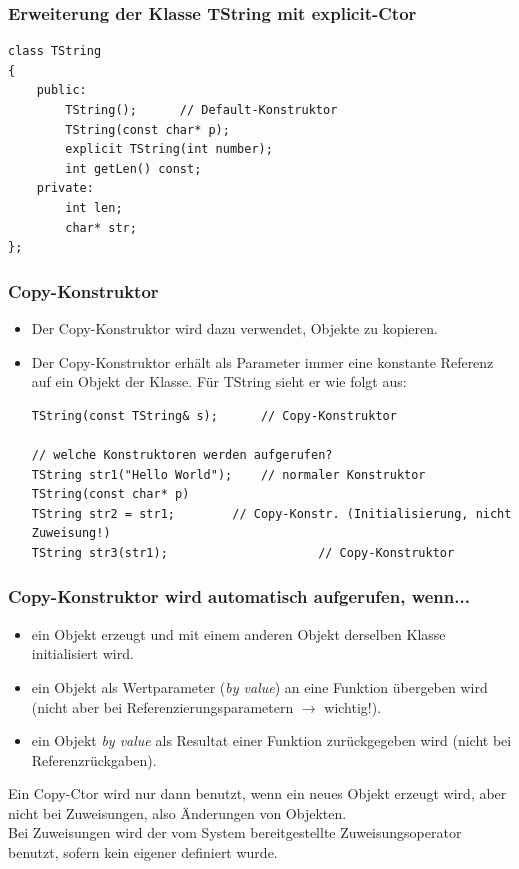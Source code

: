\subsubsection{Erweiterung der Klasse TString mit explicit-Ctor}
\vspace{-\baselineskip}
\begin{minipage}{0.5\linewidth}
\begin{lstlisting}
class TString
{
	public:
		TString();		// Default-Konstruktor
		TString(const char* p);
		explicit TString(int number);
		int getLen() const;
	private:
		int len;
		char* str;
};
\end{lstlisting}
\end{minipage}

\subsubsection{Copy-Konstruktor}
\begin{itemize}
	\item Der Copy-Konstruktor wird dazu verwendet, Objekte zu kopieren.
	\item Der Copy-Konstruktor erhält als Parameter immer eine konstante Referenz auf ein Objekt der Klasse. Für TString sieht er wie folgt aus:\\
	\vspace{-\baselineskip}
	\begin{minipage}{\linewidth}
\begin{lstlisting}
TString(const TString& s);		// Copy-Konstruktor

// welche Konstruktoren werden aufgerufen?
TString str1("Hello World");	// normaler Konstruktor TString(const char* p)
TString str2 = str1;		// Copy-Konstr. (Initialisierung, nicht Zuweisung!)
TString str3(str1);						// Copy-Konstruktor
\end{lstlisting}
	\end{minipage}
\end{itemize}

\subsubsection{Copy-Konstruktor wird automatisch aufgerufen, wenn...}
\begin{itemize}
	\item ein Objekt erzeugt und mit einem anderen Objekt derselben Klasse initialisiert wird.
	\item ein Objekt als Wertparameter (\emph{by value}) an eine Funktion übergeben wird (nicht aber bei Referenzierungsparametern $\rightarrow$ wichtig!).
	\item ein Objekt \emph{by value} als Resultat einer Funktion zurückgegeben wird (nicht bei Referenzrückgaben).
\end{itemize}
Ein Copy-Ctor wird nur dann benutzt, wenn ein neues Objekt erzeugt wird, aber nicht bei Zuweisungen, also Änderungen von Objekten.\\
Bei Zuweisungen wird der vom System bereitgestellte Zuweisungsoperator benutzt, sofern kein eigener definiert wurde.

